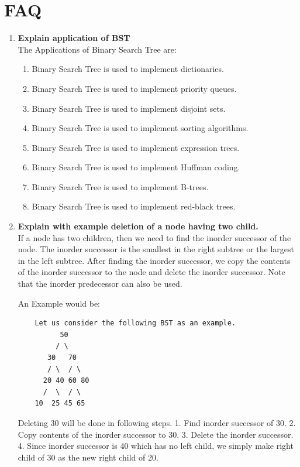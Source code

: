 \documentclass[11pt]{article}
\begin{document}
\section{FAQ}
\begin{enumerate}
	\item \textbf{Explain application of BST}\\

	      The Applications of Binary Search Tree are:
	      \begin{enumerate}
		      \item Binary Search Tree is used to implement dictionaries.
		      \item Binary Search Tree is used to implement priority queues.
		      \item Binary Search Tree is used to implement disjoint sets.
		      \item Binary Search Tree is used to implement sorting algorithms.
		      \item Binary Search Tree is used to implement expression trees.
		      \item Binary Search Tree is used to implement Huffman coding.
		      \item Binary Search Tree is used to implement B-trees.
		      \item Binary Search Tree is used to implement red-black trees.
	      \end{enumerate}
	\item \textbf{Explain with example deletion of a node having two child.}\\

	      If a node has two children, then we need to find the inorder successor of the node. The inorder successor is the smallest in the right subtree or the largest in the left subtree. After finding the inorder successor, we copy the contents of the inorder successor to the node and delete the inorder successor. Note that the inorder predecessor can also be used.

	      An Example would be:
	      \begin{verbatim}
    Let us consider the following BST as an example.
          50
         / \
       30   70
       / \  / \
      20 40 60 80
      /  \  / \
    10  25 45 65
\end{verbatim}

	      Deleting 30 will be done in following steps.
	      1. Find inorder successor of 30.
	      2. Copy contents of the inorder successor to 30.
	      3. Delete the inorder successor.
	      4. Since inorder successor is 40 which has no left child, we simply make right child of 30 as the new right child of 20.


\end{enumerate}
\end{document}
